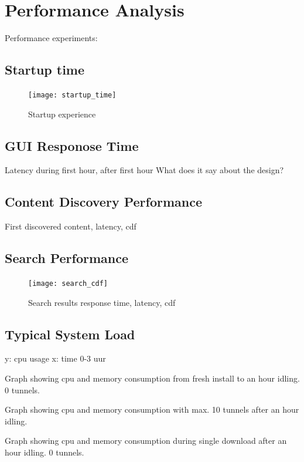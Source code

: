 \chapter{Performance Analysis}
Performance experiments:


\section{Startup time}

\begin{figure}[h]
	\centering
	\texttt{[image: startup\_time]}
	\caption{Startup experience}
	\label{fig:startup_time}
\end{figure}

\section{GUI Responose Time}
Latency during first hour, after first hour
What does it say about the design?

\section{Content Discovery Performance}
First discovered content, latency, cdf

\section{Search Performance}

\begin{figure}[h]
	\centering
	\texttt{[image: search\_cdf]}
	\caption{Search results response time, latency, cdf}
	\label{fig:search_cdf}
\end{figure}




\section{Typical System Load}
y: cpu usage
x: time 0-3 uur

Graph showing cpu and memory consumption from fresh install to an hour idling. 0 tunnels.

Graph showing cpu and memory consumption with max. 10 tunnels after an hour idling.

Graph showing cpu and memory consumption during single download after an hour idling. 0 tunnels.

